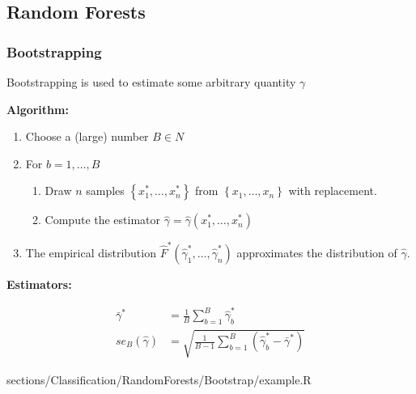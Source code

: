 \subsection{Random Forests}
	\subsubsection{Bootstrapping}
	 	\RTheory
	 	{
	 		Bootstrapping is used to estimate some arbitrary quantity $\gamma$
	 		
	 	    \textbf{Algorithm:}

			\begin{enumerate}
    	    	\item Choose a (large) number $B \in N$
    	    	\item For $b = 1,\dots,B$
    	    		\begin{enumerate}
    	    		    \item Draw $n$ samples $\left\{x_1^*,\dots,x_n^*\right\}$ from $\left\{x_1,\dots,x_n\right\}$ with replacement.
    	    		    \item Compute the estimator $\hat{\gamma} = \hat{\gamma}(x_1^*,\dots,x_n^*)$
    	    		\end{enumerate}
    	    	\item The empirical distribution $\hat{F}^*(\hat{\gamma}_1^*,\dots,\hat{\gamma}_n^*)$ approximates the distribution of $\hat{\gamma}$.
    		\end{enumerate}
    		
    		\textbf{Estimators:}
    		
    		$$\begin{aligned}
    			\bar{\gamma}^* &= \frac{1}{B} \sum\limits_{b=1}^B \hat{\gamma}_b^*\\
    			se_B(\hat{\gamma}) &= \sqrt{\frac{1}{B-1} \sum\limits_{b=1}^B (\hat{\gamma}_b^* - \bar{\gamma}^*)}
    		\end{aligned}$$
    	}
    	{
    		sections/Classification/RandomForests/Bootstrap/example.R
    	}	
    	
